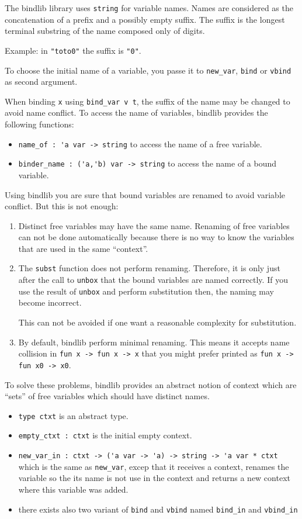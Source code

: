 \documentclass[11pt]{article}
\begin{document}
The bindlib library uses \verb#string# for variable names. Names are
considered
as the concatenation of a prefix and a possibly empty suffix. The
suffix is the longest terminal substring of the name composed only of
digits.

Example: in \verb#"toto0"# the suffix is \verb#"0"#.

To choose the initial name of a variable, you passe it to
\verb#new_var#, \verb#bind# or \verb#vbind# as second argument.

When binding \verb#x# using \verb#bind_var v t#, the suffix of
the name may be changed to avoid name conflict.
To access the name of variables, bindlib provides the following
functions:

\begin{itemize}
\item \verb#name_of : 'a var -> string# to access the name of a free
  variable.

\item \verb#binder_name : ('a,'b) var -> string# to access the
  name of a bound variable.
\end{itemize}

Using bindlib you are sure that bound variables are renamed to avoid
variable conflict. But this is not enough:
\begin{enumerate}
\item Distinct free variables may have the same name. Renaming of free
  variables can not be done automatically because there is no way to
  know the variables that are used in the same ``context''.
\item The \verb#subst# function does not perform renaming. Therefore,
  it is only just after the call to \verb#unbox# that the bound
  variables are named correctly. If you use the result of \verb#unbox#
  and perform substitution then, the naming may become incorrect.

  This can not be avoided if one want a reasonable complexity for
  substitution.

\item By default, bindlib perform minimal renaming. This means it
  accepts name collision in \verb#fun x -> fun x -> x# that you might prefer printed as
\verb#fun x -> fun x0 -> x0#.
\end{enumerate}

To solve these problems, bindlib provides an abstract notion of context
 which are ``sets'' of free variables which should have
 distinct names.
\begin{itemize}
\item\verb#type ctxt# is  an abstract type.
\item\verb#empty_ctxt : ctxt# is the initial empty context.
\item\verb#new_var_in : ctxt -> ('a var -> 'a) -> string -> 'a var * ctxt#\\
  which is the same as \verb#new_var#, excep that it receives a
  context, renames the variable so the its name is not use in the
  context and returns a new context where this variable was added.
\item there exists also two variant of \verb#bind# and \verb#vbind#
  named \verb#bind_in# and \verb#vbind_in#
\end{itemize}
\end{document}
